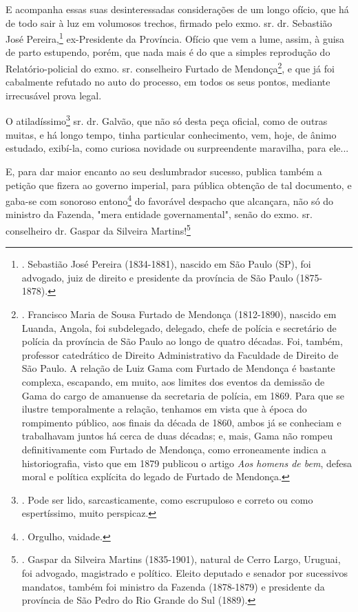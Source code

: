 E acompanha essas suas desinteressadas considerações de um longo ofício,
que há de todo sair à luz em volumosos trechos, firmado pelo exmo. sr.
dr. Sebastião José Pereira,\footnote{. Sebastião José Pereira
  (1834-1881), nascido em São Paulo (SP), foi advogado, juiz de direito
  e presidente da província de São Paulo (1875-1878).} ex-Presidente da
Província. Ofício que vem a lume, assim, à guisa de parto estupendo,
porém, que nada mais é do que a simples reprodução do Relatório-policial
do exmo. sr. conselheiro Furtado de Mendonça\footnote{. Francisco Maria
  de Sousa Furtado de Mendonça (1812-1890), nascido em Luanda, Angola,
  foi subdelegado, delegado, chefe de polícia e secretário de polícia da
  província de São Paulo ao longo de quatro décadas. Foi, também,
  professor catedrático de Direito Administrativo da Faculdade de
  Direito de São Paulo. A relação de Luiz Gama com Furtado de Mendonça é
  bastante complexa, escapando, em muito, aos limites dos eventos da
  demissão de Gama do cargo de amanuense da secretaria de polícia, em
  1869. Para que se ilustre temporalmente a relação, tenhamos em vista
  que à época do rompimento público, aos finais da década de 1860, ambos
  já se conheciam e trabalhavam juntos há cerca de duas décadas; e,
  mais, Gama não rompeu definitivamente com Furtado de Mendonça, como
  erroneamente indica a historiografia, visto que em 1879 publicou o
  artigo \emph{Aos homens de bem}, defesa moral e política explícita do
  legado de Furtado de Mendonça.}, e que já foi cabalmente refutado no
auto do processo, em todos os seus pontos, mediante irrecusável prova
legal.

O atiladíssimo\footnote{. Pode ser lido, sarcasticamente, como
  escrupuloso e correto ou como espertíssimo, muito perspicaz.} sr. dr.
Galvão, que não só desta peça oficial, como de outras muitas, e há longo
tempo, tinha particular conhecimento, vem, hoje, de ânimo estudado,
exibí-la, como curiosa novidade ou surpreendente maravilha, para ele...

E, para dar maior encanto ao seu deslumbrador sucesso, publica também a
petição que fizera ao governo imperial, para pública obtenção de tal
documento, e gaba-se com sonoroso entono\footnote{. Orgulho, vaidade.}
do favorável despacho que alcançara, não só do ministro da Fazenda,
"mera entidade governamental", senão do exmo. sr. conselheiro dr. Gaspar
da Silveira Martins!\footnote{. Gaspar da Silveira Martins (1835-1901),
  natural de Cerro Largo, Uruguai, foi advogado, magistrado e político.
  Eleito deputado e senador por sucessivos mandatos, também foi ministro
  da Fazenda (1878-1879) e presidente da província de São Pedro do Rio
  Grande do Sul (1889).}

